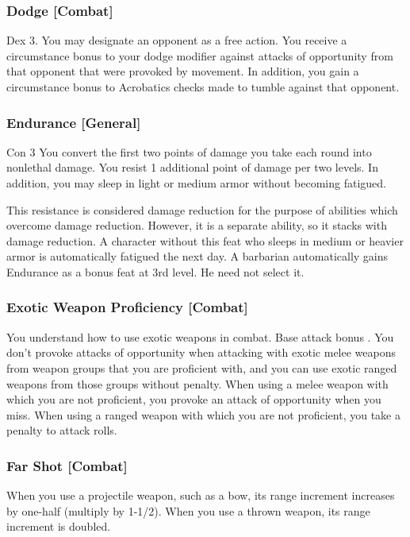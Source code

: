 \subsubsection{Dodge [Combat]}
 Dex 3.
 You may designate an opponent as a free action. You receive a  circumstance bonus to your dodge modifier against attacks of opportunity from that opponent that were provoked by movement. In addition, you gain a  circumstance bonus to Acrobatics checks made to tumble against that opponent.

\subsubsection{Endurance [General]}
\featpre Con 3
 You convert the first two points of damage you take each round into nonlethal damage. You resist 1 additional point of damage per two levels. In addition, you may sleep in light or medium armor without becoming fatigued.

This resistance is considered damage reduction for the purpose of abilities which overcome damage reduction. However, it is a separate ability, so it stacks with damage reduction.
 A character without this feat who sleeps in medium or heavier armor is automatically fatigued the next day.
 A barbarian automatically gains Endurance as a bonus feat at 3rd level. He need not select it.

\subsubsection{Exotic Weapon Proficiency [Combat]}
You understand how to use exotic weapons in combat.
 Base attack bonus .
 You don't provoke attacks of opportunity when attacking with exotic melee weapons from weapon groups that you are proficient with, and you can use exotic ranged weapons from those groups without penalty.
 When using a melee weapon with which you are not proficient, you provoke an attack of opportunity when you miss. When using a ranged weapon with which you are not proficient, you take a  penalty to attack rolls.

\subsubsection{Far Shot [Combat]}
 When you use a projectile weapon, such as a bow, its range increment increases by one-half (multiply by 1-1/2). When you use a thrown weapon, its range increment is doubled.

